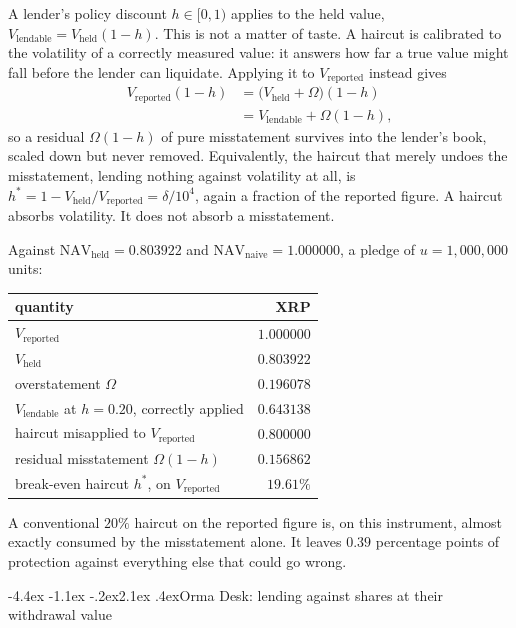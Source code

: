 \documentclass[11pt]{article}
\makeatletter
\renewcommand\section{\@startsection{section}{1}{\z@}%
  {-4.4ex \@plus -1.1ex \@minus -.2ex}{2.1ex \@plus .4ex}{\normalfont\Large\bfseries}}
\theoremstyle{orma}
\theoremstyle{ormaupright}
\makeatother
\begin{document}
A lender's policy discount $h \in [0,1)$ applies to the held value,
$V_{\mathrm{lendable}} = V_{\mathrm{held}} (1 - h)$. This is not a matter of taste. A
haircut is calibrated to the volatility of a correctly measured value: it answers how far a
true value might fall before the lender can liquidate. Applying it to
$V_{\mathrm{reported}}$ instead gives
\begin{align}
  V_{\mathrm{reported}} (1 - h)
  &= \big( V_{\mathrm{held}} + \Omega \big)(1 - h)
  \\[4pt]
  &= V_{\mathrm{lendable}} + \Omega (1 - h),
\end{align}
so a residual $\Omega(1-h)$ of pure misstatement survives into the lender's book, scaled
down but never removed. Equivalently, the haircut that merely undoes the misstatement,
lending nothing against volatility at all, is
$h^{*} = 1 - V_{\mathrm{held}}/V_{\mathrm{reported}} = \delta/10^{4}$, again a fraction of
the reported figure. A haircut absorbs volatility. It does not absorb a misstatement.

Against $\mathrm{NAV}_{\mathrm{held}} = 0.803922$ and
$\mathrm{NAV}_{\mathrm{naive}} = 1.000000$, a pledge of $u = 1{,}000{,}000$ units:

\begin{center}
\begin{tabular}{lr}
\toprule
quantity & XRP \\
\midrule
$V_{\mathrm{reported}}$ & $1.000000$ \\
$V_{\mathrm{held}}$ & $0.803922$ \\
overstatement $\Omega$ & $\mathbf{0.196078}$ \\
\addlinespace
$V_{\mathrm{lendable}}$ at $h = 0.20$, correctly applied & $0.643138$ \\
haircut misapplied to $V_{\mathrm{reported}}$ & $0.800000$ \\
residual misstatement $\Omega(1-h)$ & $0.156862$ \\
\addlinespace
break-even haircut $h^{*}$, on $V_{\mathrm{reported}}$ & $19.61\%$ \\
\bottomrule
\end{tabular}
\end{center}

A conventional $20\%$ haircut on the reported figure is, on this instrument, almost exactly
consumed by the misstatement alone. It leaves $0.39$ percentage points of protection against
everything else that could go wrong.

\section{Orma Desk: lending against shares at their withdrawal value}
\label{sec:desk}
\end{document}

